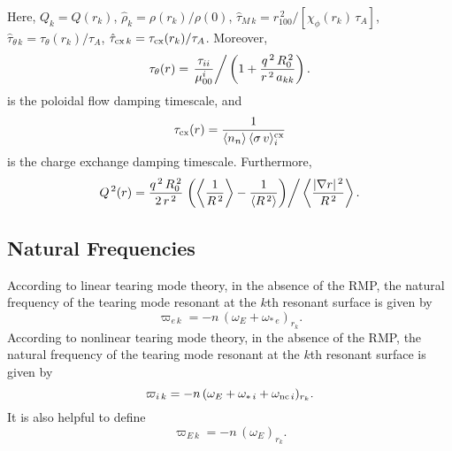 \documentclass[notitlepage,12pt]{article}
\begin{document}
Here, $Q_k = Q(r_k)$, $\hat{\rho}_k=\rho(r_k)/\rho(0)$, $\hat{\tau}_{M\,k}= r_{100}^{\,2}/[\chi_\phi(r_k)\,\tau_A]$,  $\hat{\tau}_{\theta\,k}=\tau_\theta(r_k)/\tau_A$, $\hat{\tau}_{{\rm cx}\,k} =\tau_{{\rm cx}}(r_k)/\tau_A$. 
Moreover, 
\begin{equation}\label{a70}
\tau_\theta(r) = \left. \frac{\tau_{ii}}{\mu_{00}^i}\right/\left(1+\frac{q^{\,2}\,R_0^{\,2}}{r^{\,2}\,a_{kk}}\right).
\end{equation}
is the poloidal flow damping timescale, 
and
\begin{equation}
\tau_{\rm cx}(r)=\frac{1}{\langle n_n\rangle\,\langle \sigma\,v\rangle_i^{\rm cx}}
\end{equation}
is the charge exchange damping timescale. 
Furthermore,
\begin{equation}\label{a71}
Q^{\,2}(r) =\frac{q^{\,2}\,R_0^{\,2}}{2\,r^{\,2}}\left.\left(\left\langle\frac{1}{R^{\,2}}\right\rangle-\frac{1}{\langle R^{\,2}\rangle}\right)\right/\left\langle \frac{|\nabla r|^{\,2}}{R^{\,2}}\right\rangle.
\end{equation}

\subsection{Natural Frequencies}
According to linear tearing mode theory, in the absence of the RMP, the natural frequency of the tearing mode resonant at the $k$th resonant surface is given by
\begin{equation}\label{elin}
 \varpi_{e\,k} = - n\,(\omega_E+\omega_{\ast\,e})_{r_k}.
\end{equation}
According to nonlinear tearing mode theory, in the absence of the RMP, 
the natural frequency of the tearing mode resonant at the $k$th resonant surface is given by
\begin{equation}\label{e28y}
 \varpi_{i\,k}=  -n\,(\omega_E+\omega_{\ast\,i}+\omega_{{\rm nc}\,i})_{r_k}.
 \end{equation}
 It is also helpful to define
 \begin{equation}
 \varpi_{E\,k}=  -n\,(\omega_E)_{r_k}.
 \end{equation}
\end{document}
